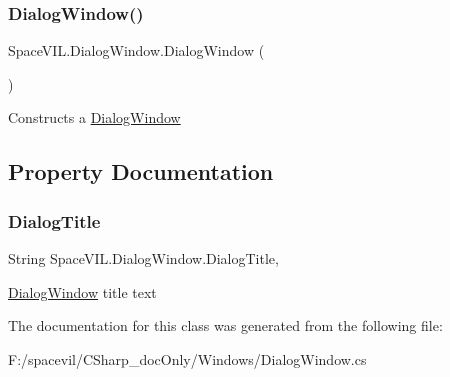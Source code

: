 \subsubsection{\texorpdfstring{Dialog\+Window()}{DialogWindow()}}
{\footnotesize\ttfamily Space\+V\+I\+L.\+Dialog\+Window.\+Dialog\+Window (\begin{DoxyParamCaption}{ }\end{DoxyParamCaption})}



Constructs a \mbox{\hyperlink{class_space_v_i_l_1_1_dialog_window}{Dialog\+Window}} 



\subsection{Property Documentation}
\mbox{\label{class_space_v_i_l_1_1_dialog_window_a91fb9fd6d98afaad9d89a88891bb3250}} 
\subsubsection{\texorpdfstring{Dialog\+Title}{DialogTitle}}
{\footnotesize\ttfamily String Space\+V\+I\+L.\+Dialog\+Window.\+Dialog\+Title\hspace{0.3cm}{\ttfamily [get]}, {\ttfamily [set]}}



\mbox{\hyperlink{class_space_v_i_l_1_1_dialog_window}{Dialog\+Window}} title text 



The documentation for this class was generated from the following file\+:\begin{DoxyCompactItemize}
\item 
F\+:/spacevil/\+C\+Sharp\+\_\+doc\+Only/\+Windows/Dialog\+Window.\+cs\end{DoxyCompactItemize}
